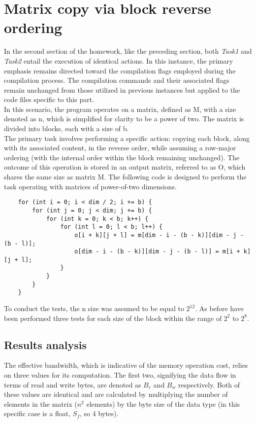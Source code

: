 \documentclass{article}
\begin{document}
\section{Matrix copy via block reverse ordering}
In the second section of the homework, like the preceding section, both \textit{Task1} and \textit{Task2} entail the execution of identical actions.%
In this instance, the primary emphasis remains directed toward the compilation flags employed during the compilation process. The compilation commands and their associated flags remain unchanged from those utilized in previous instances but applied to the code files specific to this part.\\
In this scenario, the program operates on a matrix, defined as M, with a size denoted as n, which is simplified for clarity to be a power of two. %
The matrix is divided into blocks, each with a size of b.\\
The primary task involves performing a specific action: copying each block, along with its associated content, in the reverse order, while assuming a row-major ordering (with the internal order within the block remaining unchanged). The outcome of this operation is stored in an output matrix, referred to as O, which shares the same size as matrix M.
The following code is designed to perform the task operating with matrices of power-of-two dimensions.

\begin{code}
    \begin{verbatim}
    for (int i = 0; i < dim / 2; i += b) {
        for (int j = 0; j < dim; j += b) {
            for (int k = 0; k < b; k++) {
                for (int l = 0; l < b; l++) {
                    o[i + k][j + l] = m[dim - i - (b - k)][dim - j - (b - l)];
                    o[dim - i - (b - k)][dim - j - (b - l)] = m[i + k][j + l];
                }
            }
        }
    }
    \end{verbatim}
\end{code}

To conduct the tests, the n size was assumed to be equal to $2^{12}$. As before have been performed three tests for each size of the block within the range of $2^2$ to $2^8$.
\subsection*{Results analysis}

The effective bandwidth, which is indicative of the memory operation cost, relies on three values for its computation. %
The first two, signifying the data flow in terms of read and write bytes, are denoted as $B_r$ and $B_w$ respectively. %
Both of these values are identical and are calculated by multiplying the number of elements in the matrix ($n^2$ elements) by the byte size of the data type (in this specific case is a float, $S_f$, so 4 bytes).
\end{document}
